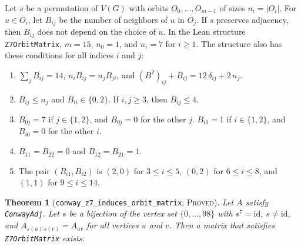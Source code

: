 \documentclass{article}
\theoremstyle{plain}
\newtheorem{theorem}{Theorem}[section]
\theoremstyle{definition}
\numberwithin{equation}{section}
\begin{document}
Let $s$ be a permutation of $V(G)$ with orbits $O_0, \dots, O_{m-1}$ of sizes $n_i = |O_i|$.
For $u \in O_i$, let $B_{ij}$ be the number of neighbors of $u$ in $O_j$.
If $s$ preserves adjacency, then $B_{ij}$ does not depend on the choice of $u$.
In the Lean structure \texttt{Z7OrbitMatrix}, $m = 15$, $n_0 = 1$, and $n_i = 7$ for $i \ge 1$.
The structure also has these conditions for all indices $i$ and $j$:
\begin{enumerate}
 \item $\sum_{j} B_{ij} = 14$, $n_i B_{ij} = n_j B_{ji}$, and $(B^2)_{ij} + B_{ij} = 12\,\delta_{ij} + 2\,n_j$.
 \item $B_{ij} \le n_j$ and $B_{ii} \in \{0, 2\}$. If $i, j \ge 3$, then $B_{ij} \le 4$.
 \item $B_{0j} = 7$ if $j \in \{1, 2\}$, and $B_{0j} = 0$ for the other $j$. $B_{i0} = 1$ if $i \in \{1, 2\}$, and $B_{i0} = 0$ for the other $i$.
 \item $B_{11} = B_{22} = 0$ and $B_{12} = B_{21} = 1$.
 \item The pair $(B_{i1}, B_{i2})$ is $(2, 0)$ for $3 \le i \le 5$, $(0, 2)$ for $6 \le i \le 8$, and $(1, 1)$ for $9 \le i \le 14$.
\end{enumerate}

\begin{theorem}[\texttt{conway\_z7\_induces\_orbit\_matrix}; \textsc{Proved}]
\label{thm:z7_reduction}
Let $A$ satisfy \texttt{ConwayAdj}. Let $s$ be a bijection of the vertex set $\{0, \dots, 98\}$ with $s^7 = \mathrm{id}$, $s \ne \mathrm{id}$, and $A_{s(u)\,s(v)} = A_{uv}$ for all vertices $u$ and $v$. Then a matrix that satisfies \texttt{Z7OrbitMatrix} exists.
\end{theorem}
\end{document}

